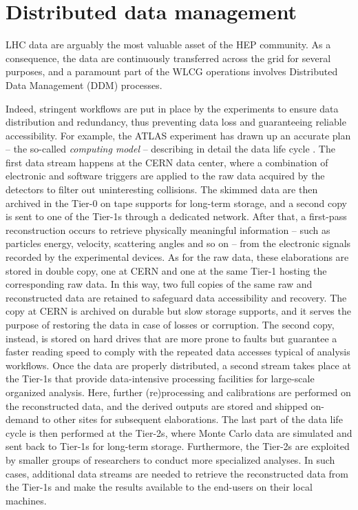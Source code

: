 \section{Distributed data management}
\label{ddm}

LHC data are arguably the most valuable asset of the HEP community.
As a consequence, the data are continuously transferred across the grid for several purposes, and a paramount part of the WLCG operations involves Distributed Data Management (DDM) processes.

Indeed, stringent workflows are put in place by the experiments to ensure data distribution and redundancy, thus preventing data loss and guaranteeing reliable accessibility.
For example, the ATLAS experiment has drawn up an accurate plan -- the so-called \textit{computing model} -- describing in detail the data life cycle \cite{aad2008atlas, calafiura2020design_report, bird2011computing}.
The first data stream happens at the CERN data center, where a combination of electronic and software triggers are applied to the raw data acquired by the detectors to filter out uninteresting collisions.
The skimmed data are then archived in the Tier-0 on tape supports for long-term storage, and a second copy is sent to one of the Tier-1s through a dedicated network. 
After that, a first-pass reconstruction occurs to retrieve physically meaningful information -- such as particles energy, velocity, scattering angles and so on  -- from the electronic signals recorded by the experimental devices.
As for the raw data, these elaborations are stored in double copy, one at CERN and one at the same Tier-1 hosting the corresponding raw data.
In this way, two full copies of the same raw and reconstructed data are retained to safeguard data accessibility and recovery.
The copy at CERN is archived on durable but slow storage supports, and it serves the purpose of restoring the data in case of losses or corruption. The second copy, instead, is stored on hard drives that are more prone to faults but guarantee a faster reading speed to comply with the repeated data accesses typical of analysis workflows.
Once the data are properly distributed, a second stream takes place at the Tier-1s that provide data-intensive processing facilities for large-scale organized analysis. Here, further (re)processing and calibrations are performed on the reconstructed data, and the derived outputs are stored and shipped on-demand to other sites for subsequent elaborations.
The last part of the data life cycle is then performed at the Tier-2s, where Monte Carlo data are simulated and sent back to Tier-1s for long-term storage. 
Furthermore, the Tier-2s are exploited by smaller groups of researchers to conduct more specialized analyses. In such cases, additional data streams are needed to retrieve the reconstructed data from the Tier-1s and make the results available to the end-users on their local machines.

